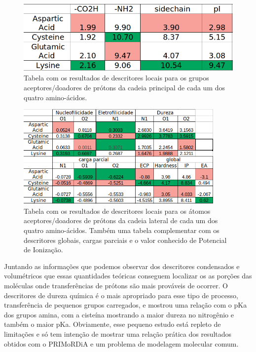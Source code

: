\documentclass[a4paper,11pt]{refart}
\begin{document}
\hspace*{-\leftmarginwidth}
\begin{minipage}{\fullwidth}
	\begin{figure}[H]
		\begin{center}
			\includegraphics[width=5in]{images/tut4_img17}
			\caption{Tabela com os resultados de descritores locais para os grupos aceptores/doadores de prótons da cadeia principal de cada um dos quatro amino-ácidos.}
			\label{fig_tut4_15}
		\end{center}
	\end{figure}
\end{minipage}

\hspace*{-\leftmarginwidth}
\begin{minipage}{\fullwidth}
	\begin{figure}[H]
		\begin{center}
			\includegraphics[width=4in]{images/tut4_img18}
			\caption{Tabela com os resultados de descritores locais para os átomos aceptores/doadores de prótons da cadeia lateral de cada um dos quatro amino-ácidos. Também uma tabela complementar com os descritores globais, cargas parciais e o valor conhecido de Potencial de Ionização.}
			\label{fig_tut4_16}
		\end{center}
	\end{figure}
\end{minipage}

Juntando as informações que podemos observar dos descritores condensados e volumétricos que essas quantidades teóricas conseguem localizar os as porções das moléculas onde transferências de prótons são mais prováveis de ocorrer. O descritores de dureza química é o mais apropriado para esse tipo de processo, transferência de pequenos grupos carregados, e mostrou uma relação com o pKa dos grupos amina, com a cisteína mostrando a maior dureza no nitrogênio e também o maior pKa. Obviamente, esse pequeno estudo está repleto de limitações e só tem intenção de mostrar uma relação prática dos resultados obtidos com o PRIMoRDiA e um problema de modelagem molecular comum.
\end{document}
